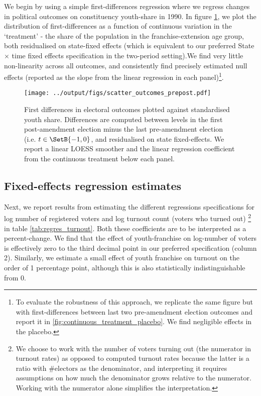 We begin by using a simple first-differences regression where we
regress changes in political outcomes on constituency youth-share in
1990. In figure \ref{fig:continuous_treatment}, we plot the
distribution of first-differences as a function of continuous
variation in the `treatment' - the share of the population in the
franchise-extension age group, both residualised on state-fixed
effects (which is equivalent to our preferred State $\times$ time
fixed effects specification in the two-period setting).We find very
little non-linearity across all outcomes, and consistently find
precisely estimated null effects (reported as the slope from the
linear regression in each panel)\footnote{To evaluate the robustness
of this approach, we replicate the same figure but with
first-differences between last two pre-amendment election outcomes and
report it in \ref{fig:continuous_treatment_placebo}. We find
negligible effects in the placebo. }.

\begin{figure}[tb]
  \centering
  \texttt{[image: ../output/figs/scatter\_outcomes\_prepost.pdf]}
  \caption{First differences in electoral outcomes plotted against
  standardised youth share. Differences are computed between levels in
  the first post-amendment election minus the last pre-amendment
  election (i.e. $t \in \SetB{-1, 0}$, and residualised on state
  fixed-effects. We report a linear LOESS smoother and the linear
  regression coefficient from the continuous treatment below each
  panel.}
  \label{fig:continuous_treatment}
\end{figure}


\subsection{Fixed-effects regression estimates}

Next, we report results from estimating the different
regressions specifications for log number of registered voters and log
turnout count (voters who turned out) \footnote{ We choose to work
with the number of voters turning out (the numerator in turnout rates)
as opposed to computed turnout rates because the latter is a ratio
with $\# \text{electors}$ as the denominator, and interpreting it
requires assumptions on how much the denominator grows relative to the
numerator. Working with the numerator alone simplifies the
interpretation.} in table \ref{tab:regres_turnout}. Both these
coefficients are to be interpreted as a percent-change. We find that
the effect of youth-franchise on log-number of voters  is effectively
zero to the third decimal point in our preferred specification (column
2). Similarly, we estimate a small effect of youth franchise on
turnout on the order of 1 percentage point, although this is also
statistically indistinguishable from 0.

